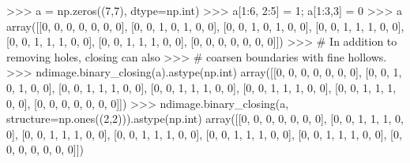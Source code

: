 \begin{DoxyVerb}
>>> a = np.zeros((7,7), dtype=np.int)
>>> a[1:6, 2:5] = 1; a[1:3,3] = 0
>>> a
array([[0, 0, 0, 0, 0, 0, 0],
       [0, 0, 1, 0, 1, 0, 0],
       [0, 0, 1, 0, 1, 0, 0],
       [0, 0, 1, 1, 1, 0, 0],
       [0, 0, 1, 1, 1, 0, 0],
       [0, 0, 1, 1, 1, 0, 0],
       [0, 0, 0, 0, 0, 0, 0]])
>>> # In addition to removing holes, closing can also
>>> # coarsen boundaries with fine hollows.
>>> ndimage.binary_closing(a).astype(np.int)
array([[0, 0, 0, 0, 0, 0, 0],
       [0, 0, 1, 0, 1, 0, 0],
       [0, 0, 1, 1, 1, 0, 0],
       [0, 0, 1, 1, 1, 0, 0],
       [0, 0, 1, 1, 1, 0, 0],
       [0, 0, 1, 1, 1, 0, 0],
       [0, 0, 0, 0, 0, 0, 0]])
>>> ndimage.binary_closing(a, structure=np.ones((2,2))).astype(np.int)
array([[0, 0, 0, 0, 0, 0, 0],
       [0, 0, 1, 1, 1, 0, 0],
       [0, 0, 1, 1, 1, 0, 0],
       [0, 0, 1, 1, 1, 0, 0],
       [0, 0, 1, 1, 1, 0, 0],
       [0, 0, 1, 1, 1, 0, 0],
       [0, 0, 0, 0, 0, 0, 0]])\end{DoxyVerb}
 \hypertarget{namespacescipy_1_1ndimage_1_1morphology_a4833d1652c340012546d6ffee4f1a19c}{}
